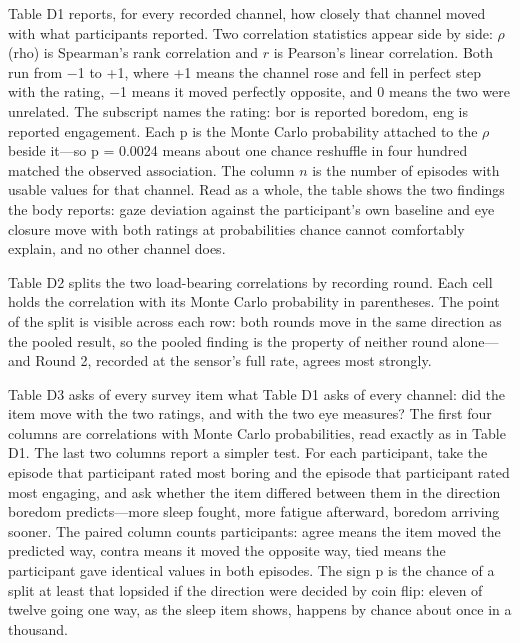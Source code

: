 Table D1 reports, for every recorded channel, how closely that channel moved with what
participants reported. Two correlation statistics appear side by side: $\rho$ (rho) is
Spearman's rank correlation and $r$ is Pearson's linear correlation. Both run from $-$1 to
+1, where +1 means the channel rose and fell in perfect step with the rating, $-$1 means it
moved perfectly opposite, and 0 means the two were unrelated. The subscript names the rating:
bor is reported boredom, eng is reported engagement. Each p is the Monte Carlo probability
attached to the $\rho$ beside it---so p = 0.0024 means about one chance reshuffle in four
hundred matched the observed association. The column $n$ is the number of episodes with
usable values for that channel. Read as a whole, the table shows the two findings the body
reports: gaze deviation against the participant's own baseline and eye closure move with both
ratings at probabilities chance cannot comfortably explain, and no other channel does.

% 

Table D2 splits the two load-bearing correlations by recording round. Each cell holds the
correlation with its Monte Carlo probability in parentheses. The point of the split is
visible across each row: both rounds move in the same direction as the pooled result, so the
pooled finding is the property of neither round alone---and Round 2, recorded at the sensor's
full rate, agrees most strongly.

% 

Table D3 asks of every survey item what Table D1 asks of every channel: did the item move
with the two ratings, and with the two eye measures? The first four columns are correlations
with Monte Carlo probabilities, read exactly as in Table D1. The last two columns report a
simpler test. For each participant, take the episode that participant rated most boring and
the episode that participant rated most engaging, and ask whether the item differed between
them in the direction boredom predicts---more sleep fought, more fatigue afterward, boredom
arriving sooner. The paired column counts participants: agree means the item moved the
predicted way, contra means it moved the opposite way, tied means the participant gave
identical values in both episodes. The sign p is the chance of a split at least that lopsided
if the direction were decided by coin flip: eleven of twelve going one way, as the sleep item
shows, happens by chance about once in a thousand.

